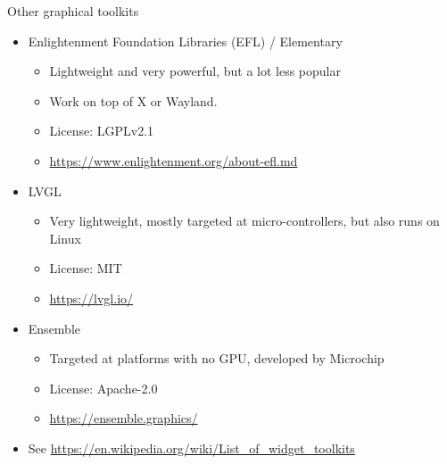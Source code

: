 \begin{frame}{Other graphical toolkits}
  \begin{itemize}
  \item Enlightenment Foundation Libraries (EFL) / Elementary
    \begin{itemize}
    \item Lightweight and very powerful, but a lot less popular
    \item Work on top of X or Wayland.
    \item License: LGPLv2.1
    \item \url{https://www.enlightenment.org/about-efl.md}
    \end{itemize}
  \item LVGL
    \begin{itemize}
    \item Very lightweight, mostly targeted at micro-controllers, but
      also runs on Linux
    \item License: MIT
    \item \url{https://lvgl.io/}
    \end{itemize}
  \item Ensemble
    \begin{itemize}
    \item Targeted at platforms with no GPU, developed by Microchip
    \item License: Apache-2.0
    \item \url{https://ensemble.graphics/}
    \end{itemize}
  \item See \url{https://en.wikipedia.org/wiki/List_of_widget_toolkits}
  \end{itemize}
\end{frame}

